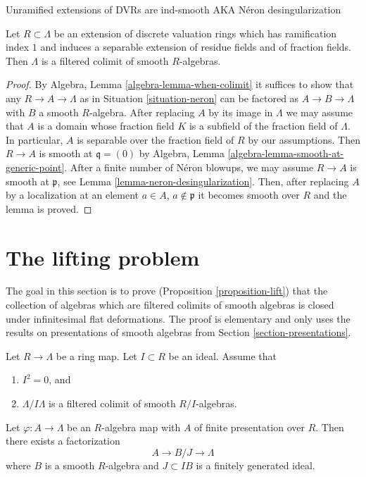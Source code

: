 \begin{lemma}
\label{lemma-neron-colimit}
\begin{slogan}
Unramified extensions of DVRs are ind-smooth AKA N\'eron desingularization
\end{slogan}
Let $R \subset \Lambda$ be an extension of discrete valuation
rings which has ramification index $1$ and induces a separable
extension of residue fields and of fraction fields.
Then $\Lambda$ is a filtered colimit of smooth $R$-algebras.
\end{lemma}

\begin{proof}
By Algebra, Lemma \ref{algebra-lemma-when-colimit} it suffices to show
that any $R \to A \to \Lambda$ as in Situation \ref{situation-neron}
can be factored as $A \to B \to \Lambda$ with $B$ a
smooth $R$-algebra. After replacing $A$ by its image in $\Lambda$
we may assume that $A$ is a domain whose fraction field $K$
is a subfield of the fraction field of $\Lambda$.
In particular, $A$ is separable over the fraction field of $R$
by our assumptions. Then $R \to A$ is smooth at $\mathfrak q = (0)$ by
Algebra, Lemma \ref{algebra-lemma-smooth-at-generic-point}.
After a finite number of N\'eron blowups, we may assume $R \to A$
is smooth at $\mathfrak p$, see Lemma \ref{lemma-neron-desingularization}.
Then, after replacing $A$ by a localization
at an element $a \in A$, $a \not \in \mathfrak p$ it becomes
smooth over $R$ and the lemma is proved.
\end{proof}












\section{The lifting problem}
\label{section-lifting}

\noindent
The goal in this section is to prove (Proposition \ref{proposition-lift})
that the collection of algebras which are filtered colimits of smooth algebras
is closed under infinitesimal flat deformations. The proof is elementary
and only uses the results on presentations of smooth algebras from
Section \ref{section-presentations}.

\begin{lemma}
\label{lemma-lift-once}
Let $R \to \Lambda$ be a ring map. Let $I \subset R$ be an ideal.
Assume that
\begin{enumerate}
\item $I^2 = 0$, and
\item $\Lambda/I\Lambda$ is a filtered colimit of smooth $R/I$-algebras.
\end{enumerate}
Let $\varphi : A \to \Lambda$ be an $R$-algebra map with $A$ of finite
presentation over $R$. Then there exists a factorization
$$
A \to B/J \to \Lambda
$$
where $B$ is a smooth $R$-algebra and $J \subset IB$ is a finitely generated
ideal.
\end{lemma}

